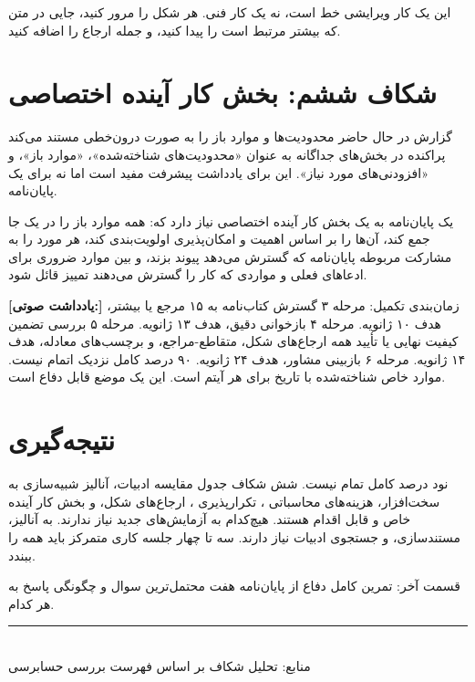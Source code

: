 \documentclass[12pt, a4paper]{article}
\newcommand{\dash}{\lr{---}}
\begin{document}
اين يک کار ويرايشی خط است، نه يک کار فنی. هر شکل را مرور کنيد، جايی در متن که بيشتر مرتبط است را پيدا کنيد، و جمله ارجاع را اضافه کنيد.

\section{شکاف ششم: بخش کار آينده اختصاصی}

گزارش در حال حاضر محدوديت‌ها و موارد باز را به صورت درون‌خطی مستند می‌کند \dash{} پراکنده در بخش‌های جداگانه به عنوان «محدوديت‌های شناخته‌شده»، «موارد باز»، و «افزودنی‌های مورد نياز». اين برای يادداشت پيشرفت مفيد است اما نه برای يک پايان‌نامه.

يک پايان‌نامه به يک بخش کار آينده اختصاصی نياز دارد که: همه موارد باز را در يک جا جمع کند، آن‌ها را بر اساس اهميت و امکان‌پذيری اولويت‌بندی کند، هر مورد را به مشارکت مربوطه پايان‌نامه که گسترش می‌دهد پيوند بزند، و بين موارد ضروری برای ادعاهای فعلی و مواردی که کار را گسترش می‌دهند تمييز قائل شود.


\begin{mdframed}[
  backgroundcolor=audiotan,
  linecolor=audionote!70,
  linewidth=1pt,
  innerleftmargin=12pt,
  innerrightmargin=12pt,
  innertopmargin=8pt,
  innerbottommargin=8pt
]
\textbf{\color{audionote}[يادداشت صوتی:]}
زمان‌بندی تکميل: مرحله ۳ \dash{} گسترش کتاب‌نامه به ۱۵ مرجع يا بيشتر، هدف ۱۰ ژانويه. مرحله ۴ \dash{} بازخوانی دقيق، هدف ۱۳ ژانويه. مرحله ۵ \dash{} بررسی تضمين کيفيت نهايی يا تأييد همه ارجاع‌های شکل، متقاطع-مراجع، و برچسب‌های معادله، هدف ۱۴ ژانويه. مرحله ۶ \dash{} بازبينی مشاور، هدف ۲۴ ژانويه. ۹۰ درصد کامل نزديک اتمام نيست. موارد خاص شناخته‌شده با تاريخ برای هر آيتم است. اين يک موضع قابل دفاع است.
\end{mdframed}

\vspace{0.6cm}

\section{نتيجه‌گيری}

نود درصد کامل تمام نيست. شش شکاف \dash{} جدول مقايسه ادبيات، آناليز شبيه‌سازی به سخت‌افزار، هزينه‌های محاسباتی ، تکرارپذيری ، ارجاع‌های شکل، و بخش کار آينده \dash{} خاص و قابل اقدام هستند. هيچ‌کدام به آزمايش‌های جديد نياز ندارند. به آناليز، مستندسازی، و جستجوی ادبيات نياز دارند. سه تا چهار جلسه کاری متمرکز بايد همه را ببندد.

قسمت آخر: تمرين کامل دفاع از پايان‌نامه \dash{} هفت محتمل‌ترين سوال و چگونگی پاسخ به هر کدام.

\vspace{1.5cm}
\begin{center}
{\color{seriesblue}\rule{0.45\linewidth}{0.4pt}}\\[8pt]
{\small\color{sectiongray}
منابع: تحليل شکاف بر اساس فهرست بررسی حسابرسی 
}
\end{center}
\end{document}
